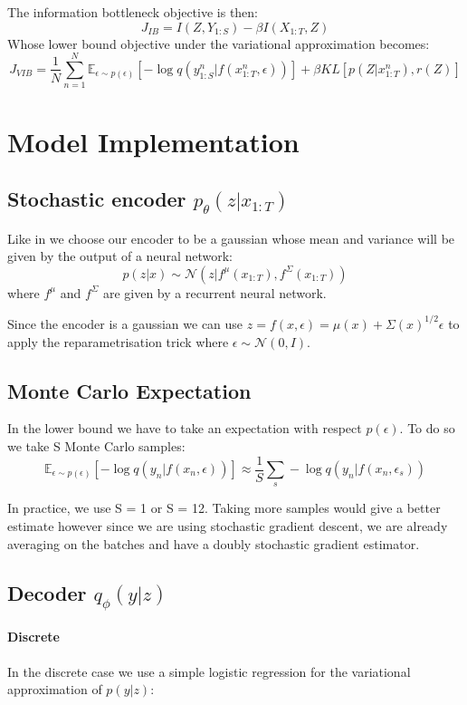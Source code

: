 \documentclass[11pt,oneside,openright]{report}
\begin{document}
The information bottleneck objective is then:
$$ J_{IB} = I(Z, Y_{1:S}) - \beta I(X_{1:T}, Z)$$
Whose lower bound objective under the variational approximation becomes:
 $$ J_{VIB} = \frac{1}{N}  \sum_{n=1}^{N} \mathbb{E}_{\epsilon \sim p(\epsilon)}[- \log q(y_{1:S}^n |f(x_{1:T}^n, \epsilon))] + \beta KL[p(Z|x_{1:T}^n), r(Z)]$$

\section{Model Implementation}

\subsection{Stochastic encoder $p_\theta(z|x_{1:T})$}
Like in \cite{vib} we choose our encoder to be a gaussian whose mean and variance will be given by the output of a neural network:
$$ p(z|x) \sim \mathcal{N}(z | f^\mu(x_{1:T}), f^\Sigma(x_{1:T}))$$ where $f^\mu$ and $f^\Sigma$ are given by a recurrent neural network.

Since the encoder is a gaussian we can use  $z = f(x, \epsilon) =  \mu(x) + \Sigma(x)^{1/2} \epsilon$ to apply the reparametrisation trick where $\epsilon \sim \mathcal{N}(0, I)$. 

\subsection{Monte Carlo Expectation}

In the lower bound we have to take an expectation with respect $p(\epsilon)$. To do so we take S Monte Carlo samples: 
 $$ \mathbb{E}_{\epsilon \sim p(\epsilon)}[- \log q(y_{n} |f(x_{n}, \epsilon))] \approx \frac{1}{S}\sum_s - \log q(y_{n} |f(x_{n}, \epsilon_s)) $$
 
 In practice, we use S = 1 or S = 12. Taking more samples would give a better estimate however since we are using stochastic gradient descent, we are already averaging on the batches and have a doubly stochastic gradient estimator.
 
\subsection{Decoder $q_\phi(y|z)$}

\paragraph{Discrete}
In the discrete case we use a simple logistic regression for the variational approximation of $p(y|z)$:
\end{document}
